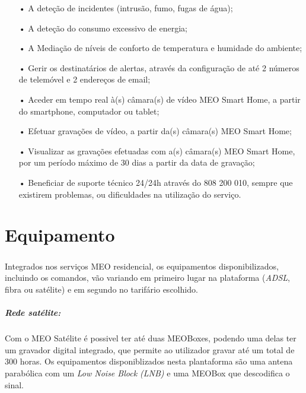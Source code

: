 \documentclass{report}
\begin{document}
\begin{itemize}
\item[•]A deteção de incidentes (intrusão, fumo, fugas de água);
\item[•]A deteção do consumo excessivo de energia;
\item[•]A Mediação de níveis de conforto de temperatura e humidade do ambiente;
\item[•]Gerir os destinatários de alertas, através da configuração de até 2 números de telemóvel e 2 endereços de email;
\item[•]Aceder em tempo real à(s) câmara(s) de vídeo MEO Smart Home, a partir do smartphone, computador ou tablet;
\item[•]Efetuar gravações de vídeo, a partir da(s) câmara(s) MEO Smart Home;
\item[•]Visualizar as gravações efetuadas com a(s) câmara(s) MEO Smart Home, por um período máximo de 30 dias a partir da data de gravação;
\item[•]Beneficiar de suporte técnico 24/24h através do 808 200 010, sempre que existirem problemas, ou dificuldades na utilização do serviço.
\end{itemize}

\chapter{Equipamento}
\label{chap.equipamento}

\paragraph{}Integrados nos serviços MEO residencial, os equipamentos disponibilizados, incluindo os comandos, vão variando em primeiro lugar na plataforma (\textit{ADSL}, fibra ou satélite) e em segundo no tarifário escolhido.

\paragraph{Rede satélite:}

\paragraph{}Com o MEO Satélite é possivel ter até duas MEOBoxes, podendo uma delas ter um gravador digital integrado, que permite ao utilizador gravar até um total de 300 horas. Os equipamentos disponiblizados nesta plantaforma são uma antena parabólica com um \textit{Low Noise Block (LNB)} e uma MEOBox que descodifica o sinal.
\end{document}
